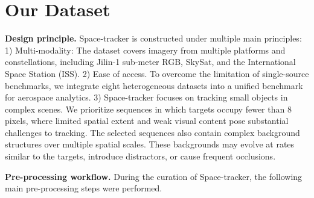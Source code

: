 \documentclass{article}
\begin{document}
\section{Our Dataset}

\label{sec:dataset}
\noindent\textbf{Design principle.}
Space-tracker is constructed under multiple main principles:  1) Multi-modality: The dataset covers imagery from multiple platforms and constellations, including Jilin-1 sub-meter RGB, SkySat, and the International Space Station (ISS). %
2) Ease of access. To overcome the limitation of single-source benchmarks, we integrate eight heterogeneous datasets into a unified benchmark for aerospace analytics. 3) Space-tracker focuses on tracking small objects in complex scenes. We prioritize sequences in which targets occupy fewer than 8 pixels, where
limited spatial extent and weak visual content pose substantial challenges to tracking. The selected sequences also contain complex background structures over multiple spatial scales. These backgrounds may evolve at rates similar to the targets, introduce distractors, or cause frequent occlusions. %

\noindent\textbf{Pre-processing workflow.} During the curation of Space-tracker, the following main pre-processing steps were performed.
\end{document}
